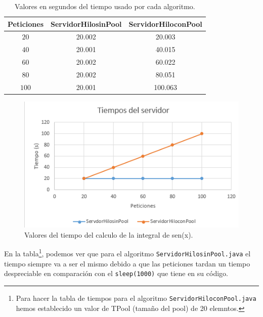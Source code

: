 \documentclass[12pt,letterpaper]{article}
\begin{document}
\begin{center}
	\begin{table}[htbp]
		\begin{center}
			\begin{tabular}{|c|c|c|}
				\hline
				\textbf{Peticiones} & \textbf{ServidorHilosinPool} & \textbf{ServidorHiloconPool}  \\
				\hline
				$20$ & 20.002 & 20.003  \\ \hline
				$40$ & 20.001 & 40.015  \\ \hline
				$60$ & 20.002 & 60.022  \\ \hline
				$80$ & 20.002 & 80.051  \\ \hline
				$100$ & 20.001 & 100.063  \\ \hline
			\end{tabular}
			\caption{Valores en segundos del tiempo usado por cada algoritmo.}
			\label{tabla:Valores en segundos del tiempo usado por cada algoritmo}
		\end{center}
	\end{table}
\end{center}
\begin{figure}
	\begin{center}
		\includegraphics[scale=1]{TiempoServidor.png}
		\caption{Valores del tiempo del calculo de la integral de sen(x).}
		\label{fig:Valores del tiempo del calculo de la integral de sen(x)}
	\end{center}
\end{figure}
\noindent
En la tabla\footnote[1]{Para hacer la tabla de tiempos para el algoritmo \texttt{ServidorHiloconPool.java} hemos establecido un valor de TPool (tamaño del pool) de 20 elemntos.}, podemos ver que para el algoritmo \texttt{ServidorHilosinPool.java} el tiempo siempre va a ser el mismo debido a que las peticiones tardan un tiempo despreciable en comparación con el \texttt{sleep(1000)} que tiene en su código.\\
\end{document}
